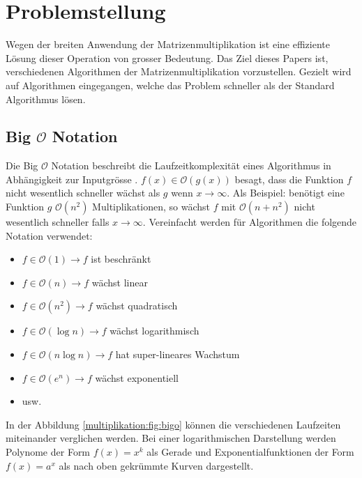 %
%
%
\section{Problemstellung}
Wegen der breiten Anwendung der Matrizenmultiplikation ist eine effiziente L\"osung dieser Operation von grosser Bedeutung.
Das Ziel dieses Papers ist, verschiedenen Algorithmen der Matrizenmultiplikation vorzustellen.
Gezielt wird auf Algorithmen eingegangen, welche das Problem schneller als der Standard Algorithmus l\"osen.

\subsection{Big $\mathcal{O}$ Notation}
\label{muliplikation:sec:bigo}
Die Big $\mathcal{O}$ Notation beschreibt die Laufzeitkomplexit\"at eines Algorithmus in Abhängigkeit zur Inputgrösse \cite{multiplikation:bigo}.
$f(x) \in \mathcal{O}(g(x))$ besagt, dass die Funktion $f$ nicht wesentlich schneller w\"achst als $g$ wenn $x \rightarrow \infty$.
Als Beispiel: benötigt eine Funktion $g$ $\mathcal{O} (n^2  )$ Multiplikationen, so wächst $f$ mit $\mathcal{O} (n+ n^2  )$ nicht wesentlich schneller falls $x\to\infty$.
Vereinfacht werden f\"ur Algorithmen die folgende Notation verwendet:
\begin{itemize}
	\item $f \in \mathcal{O}(1) \rightarrow f$ ist beschr\"ankt
	\item $f \in \mathcal{O}(n) \rightarrow f$ w\"achst linear
	\item $f \in \mathcal{O}  (n^2   ) \rightarrow f$ w\"achst quadratisch
	\item $f \in \mathcal{O}(\log n) \rightarrow f$ w\"achst logarithmisch
	\item $f \in \mathcal{O}(n \log n) \rightarrow f$ hat super-lineares Wachstum
	\item $f \in \mathcal{O}  (e^n   ) \rightarrow f$ w\"achst exponentiell
	\item usw.
\end{itemize}

In der Abbildung \ref{multiplikation:fig:bigo} k\"onnen die verschiedenen Laufzeiten miteinander verglichen werden.
Bei einer logarithmischen Darstellung werden Polynome der Form $f(x) = x^k$ als Gerade und Exponentialfunktionen der Form $f(x) = a^x$ als nach oben gekr\"ummte Kurven dargestellt.



